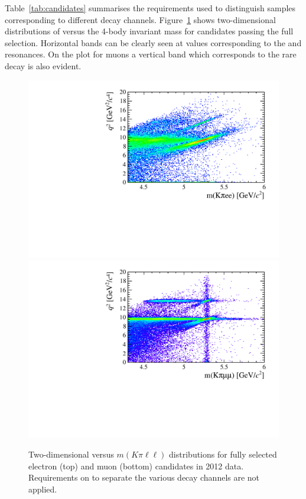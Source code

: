 Table~\ref{tab:candidates} summarises the requirements used to distinguish samples corresponding to different decay channels.
Figure~\ref{fig:2D_q2_B0mass} shows two-dimensional distributions of \qsq versus the 4-body invariant mass 
for candidates passing the full selection. Horizontal bands can be clearly seen at \qsq values corresponding to the \jpsi and \psitwos resonances.
On the plot for muons a vertical band which corresponds to the rare decay is also evident.

\begin{figure}[h!]
\centering 
\includegraphics[width=1.\textwidth]{RKst/figs/electron_B0jpsi2D_selected.pdf}
\includegraphics[width=1.\textwidth]{RKst/figs/muon_B0jpsi2D_selected.pdf}
\caption{Two-dimensional \qsq versus $m(K\pi\ell\ell)$ distributions for 
fully selected electron (top) and muon (bottom) candidates in 2012 data. 
Requirements on \qsq to separate the various decay channels are not applied.}
\label{fig:2D_q2_B0mass}
\end{figure}


